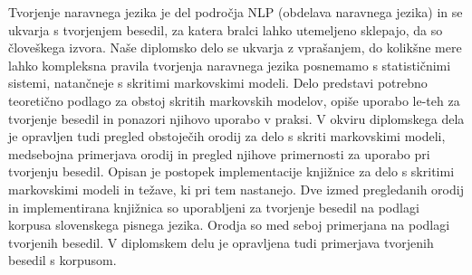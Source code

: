 Tvorjenje naravnega jezika je del področja NLP (obdelava naravnega jezika) in se ukvarja s tvorjenjem besedil, za katera bralci lahko utemeljeno sklepajo, da so človeškega izvora.
Naše diplomsko delo se ukvarja z vprašanjem, do kolikšne mere lahko kompleksna pravila tvorjenja naravnega jezika posnemamo s statističnimi sistemi, natančneje s skritimi markovskimi modeli. 
Delo predstavi potrebno teoretično podlago za obstoj skritih markovskih modelov, opiše uporabo le-teh za tvorjenje besedil in ponazori njihovo uporabo v praksi.
V okviru diplomskega dela je opravljen tudi pregled obstoječih orodij za delo s skriti markovskimi modeli, medsebojna primerjava orodij in pregled njihove primernosti za uporabo pri tvorjenju besedil.
Opisan je postopek implementacije knjižnice za delo s skritimi markovskimi modeli in
težave, ki pri tem nastanejo.
Dve izmed pregledanih orodij in implementirana knjižnica so uporabljeni za tvorjenje besedil na podlagi korpusa slovenskega pisnega jezika.
Orodja so med seboj primerjana na podlagi tvorjenih besedil.
V diplomskem delu je opravljena tudi primerjava tvorjenih besedil s korpusom.
